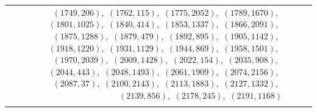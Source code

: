 \documentclass[11pt]{article}
\begin{document}
\begin{longtable}{@{}rrl>{\raggedright\arraybackslash}p{}@{}}
$(1749,206)$,\allowbreak\ $(1762,115)$,\allowbreak\ $(1775,2052)$,\allowbreak\ $(1789,1670)$,\allowbreak\ $(1801,1025)$,\allowbreak\ $(1840,414)$,\allowbreak\ $(1853,1337)$,\allowbreak\ $(1866,2091)$,\allowbreak\ $(1875,1288)$,\allowbreak\ $(1879,479)$,\allowbreak\ $(1892,895)$,\allowbreak\ $(1905,1142)$,\allowbreak\ $(1918,1220)$,\allowbreak\ $(1931,1129)$,\allowbreak\ $(1944,869)$,\allowbreak\ $(1958,1501)$,\allowbreak\ $(1970,2039)$,\allowbreak\ $(2009,1428)$,\allowbreak\ $(2022,154)$,\allowbreak\ $(2035,908)$,\allowbreak\ $(2044,443)$,\allowbreak\ $(2048,1493)$,\allowbreak\ $(2061,1909)$,\allowbreak\ $(2074,2156)$,\allowbreak\ $(2087,37)$,\allowbreak\ $(2100,2143)$,\allowbreak\ $(2113,1883)$,\allowbreak\ $(2127,1332)$,\allowbreak\ $(2139,856)$,\allowbreak\ $(2178,245)$,\allowbreak\ $(2191,1168)$\\
\addlinespace[3pt]
\end{longtable}
\endgroup
\end{document}
